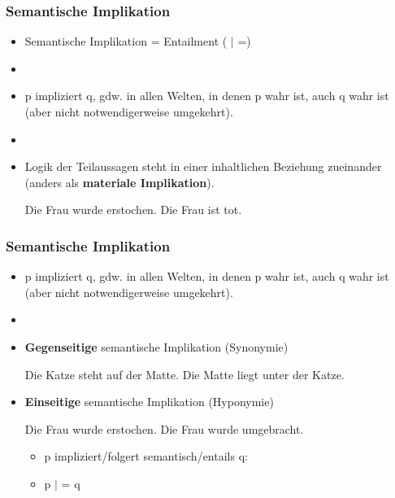 \begin{frame}
\frametitle{Semantische Implikation}

\begin{itemize}
	\item Semantische Implikation  = Entailment ( $|$ =)
	\item []
	\item p impliziert q, gdw. in allen Welten, in denen p wahr ist, auch q wahr ist (aber nicht notwendigerweise umgekehrt).
	\item[]
	\item Logik der Teilaussagen steht in einer inhaltlichen Beziehung zueinander (anders als \textbf{materiale Implikation}).

	\eal
		\ex Die Frau wurde erstochen.
		\ex Die Frau ist tot.
	\zl

\end{itemize}

\end{frame}



\begin{frame}
\frametitle{Semantische Implikation}

\begin{itemize}
	\item p impliziert q, gdw. in allen Welten, in denen p wahr ist, auch q wahr ist (aber nicht notwendigerweise umgekehrt).
	\item[]
	\item \textbf{Gegenseitige} semantische Implikation (\ras Synonymie)
	
	\eal
		\ex Die Katze steht auf der Matte.
		\ex Die Matte liegt unter der Katze.
	\zl
	
	\item \textbf{Einseitige} semantische Implikation (\ras Hyponymie)
	
	\eal
		\ex Die Frau wurde erstochen.
		\ex Die Frau wurde umgebracht.
	\zl
	
	\begin{itemize}
		\item p impliziert/folgert semantisch/entails q:
		\item p $|$ = q
	\end{itemize}
	
\end{itemize}

\end{frame}



